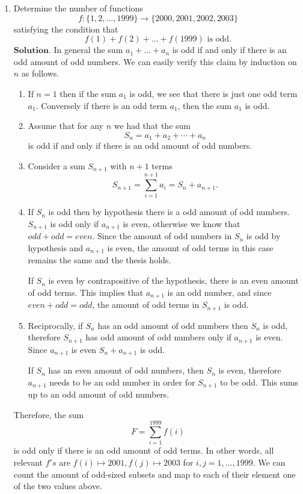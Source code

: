 \documentclass{article}
\theoremstyle{remark}
\begin{document}
\begin{enumerate}
        \item Determine the number of functions 
        \[
        f : \{1,2,\dots,1999\} \to \{2000, 2001, 2002, 2003\}
        \]
        satisfying the condition that 
        \[
        f(1) + f(2) + \dots + f(1999) \text{ is odd}.
        \]
        $\textbf{Solution.}$
        In general the sum $a_1 + \dots + a_n$ is odd if and only if there is an odd amount of odd numbers.
        We can easily verify this claim by induction on $n$ as follows.
        \begin{enumerate}
            \item[\textbf{Basis.}] If $n = 1$ then if the sum $a_1$ is odd, we see that there is just one odd term $a_1$. 
            Conversely if there is an odd term $a_1$, then the sum $a_1$ is odd.
            \item[\textbf{Hypothesis.}] Assume that for any $n$ we had that the sum 
            \[
            S_n = a_1 + a_2 + \cdots + a_n
            \]
            is odd if and only if there is an odd amount of odd numbers.
            \item[\textbf{Thesis.}] Consider a sum $S_{n+1}$ with $n+1$ terms 
            \[
            S_{n+1} = \sum_{i=1}^{n+1}a_i = S_n + a_{n+1}.
            \]
            \item[$(\implies)$]
            If $S_{n}$ is odd then by hypothesis there is a odd amount of odd numbers.
            $S_{n+1}$ is odd only if $a_{n+1}$ is even, otherwise we know that $odd + odd = even$.
            Since the amount of odd numbers in $S_n$ is odd by hypothesis and $a_{n+1}$ is even, the amount of odd terms in this case remains the same and the thesis holds.
            
            If $S_{n}$ is even by contrapositive of the hypothesis, there is an even amount of odd terms. This implies that $a_{n+1}$ is an odd number, 
            and since $even + odd = odd$, the amount of odd terms in $S_{n+1}$ is odd.

            \item[$(\impliedby)$]
            Reciprocally, if $S_n$ has an odd amount of odd numbers then $S_n$ is odd,
            therefore $S_{n+1}$ has odd amount of odd numbers only if $a_{n+1}$ is even.
            Since $a_{n+1}$ is even $S_{n} + a_{n+1}$ is odd.

            If $S_n$ has an even amount of odd numbers, then $S_n$ is even, therefore $a_{n+1}$ needs to be an odd number in order for $S_{n+1}$ to be odd.
            This sums up to an odd amount of odd numbers.
        \end{enumerate}
        Therefore, the sum 
        \[
        F = \sum_{i=1}^{1999}f(i)
        \]
        is odd only if there is an odd amount of odd terms.
        In other words,
        all relevant $f's$ are $f(i) \mapsto 2001, f(j) \mapsto 2003$ for $i,j = 1,\dots , 1999$.
        We can count the amount of odd-sized subsets and map to each of their element one of the two values above.


\end{enumerate}
\end{document}
